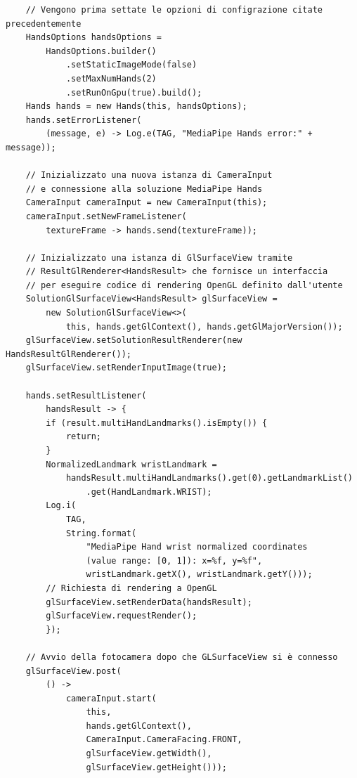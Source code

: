 \begin{verbatim}
    // Vengono prima settate le opzioni di configrazione citate precedentemente
    HandsOptions handsOptions =
        HandsOptions.builder()
            .setStaticImageMode(false)
            .setMaxNumHands(2)
            .setRunOnGpu(true).build();
    Hands hands = new Hands(this, handsOptions);
    hands.setErrorListener(
        (message, e) -> Log.e(TAG, "MediaPipe Hands error:" + message));

    // Inizializzato una nuova istanza di CameraInput
    // e connessione alla soluzione MediaPipe Hands
    CameraInput cameraInput = new CameraInput(this);
    cameraInput.setNewFrameListener(
        textureFrame -> hands.send(textureFrame));

    // Inizializzato una istanza di GlSurfaceView tramite 
    // ResultGlRenderer<HandsResult> che fornisce un interfaccia 
    // per eseguire codice di rendering OpenGL definito dall'utente
    SolutionGlSurfaceView<HandsResult> glSurfaceView =
        new SolutionGlSurfaceView<>(
            this, hands.getGlContext(), hands.getGlMajorVersion());
    glSurfaceView.setSolutionResultRenderer(new HandsResultGlRenderer());
    glSurfaceView.setRenderInputImage(true);

    hands.setResultListener(
        handsResult -> {
        if (result.multiHandLandmarks().isEmpty()) {
            return;
        }
        NormalizedLandmark wristLandmark =
            handsResult.multiHandLandmarks().get(0).getLandmarkList()
                .get(HandLandmark.WRIST);
        Log.i(
            TAG,
            String.format(
                "MediaPipe Hand wrist normalized coordinates 
                (value range: [0, 1]): x=%f, y=%f",
                wristLandmark.getX(), wristLandmark.getY()));
        // Richiesta di rendering a OpenGL
        glSurfaceView.setRenderData(handsResult);
        glSurfaceView.requestRender();
        });

    // Avvio della fotocamera dopo che GLSurfaceView si è connesso
    glSurfaceView.post(
        () ->
            cameraInput.start(
                this,
                hands.getGlContext(),
                CameraInput.CameraFacing.FRONT,
                glSurfaceView.getWidth(),
                glSurfaceView.getHeight()));

\end{verbatim}

